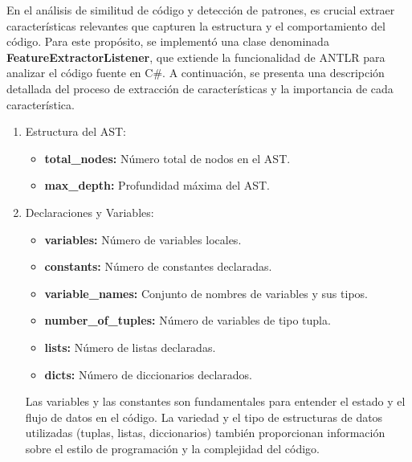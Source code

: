 En el análisis de similitud de código y detección de patrones, es crucial extraer características relevantes que capturen la estructura y el comportamiento del código. Para este propósito, se implementó una clase denominada {\bf FeatureExtractorListener}, que extiende la funcionalidad de ANTLR para analizar el código fuente en C\#. A continuación, se presenta una descripción detallada del proceso de extracción de características y la importancia de cada característica. \\

\begin{enumerate}
	\item Estructura del AST:
    		\begin{itemize}
			\item {\bf total\_nodes:} Número total de nodos en el AST.
			\item {\bf max\_depth:} Profundidad máxima del AST.
		\end{itemize}
		
	 \item Declaraciones y Variables:
    \begin{itemize}
        \item {\bf variables:} Número de variables locales.
        \item {\bf constants:} Número de constantes declaradas.
        \item {\bf variable\_names:} Conjunto de nombres de variables y sus tipos.
        \item {\bf number\_of\_tuples:} Número de variables de tipo tupla.
        \item {\bf lists:} Número de listas declaradas.
        \item {\bf dicts:} Número de diccionarios declarados.
    \end{itemize}
    Las variables y las constantes son fundamentales para entender el estado y el flujo de datos en el código. La variedad y el tipo de estructuras de datos utilizadas (tuplas, listas, diccionarios) también proporcionan información sobre el estilo de programación y la complejidad del código.


\end{enumerate}
